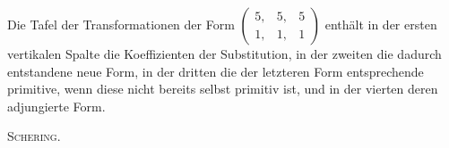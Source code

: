 Die Tafel der Transformationen der Form $\left(\begin{smallmatrix}5,&5,&5\\1,&1,&1\end{smallmatrix}\right)$ enthält in der ersten vertikalen Spalte die Koeffizienten der Substitution, in der zweiten die dadurch entstandene neue Form, in der dritten die der letzteren Form entsprechende primitive, wenn diese nicht bereits selbst primitiv ist, und in der vierten deren adjungierte Form.
\begin{flushright}\textsc{Schering.}\end{flushright}

